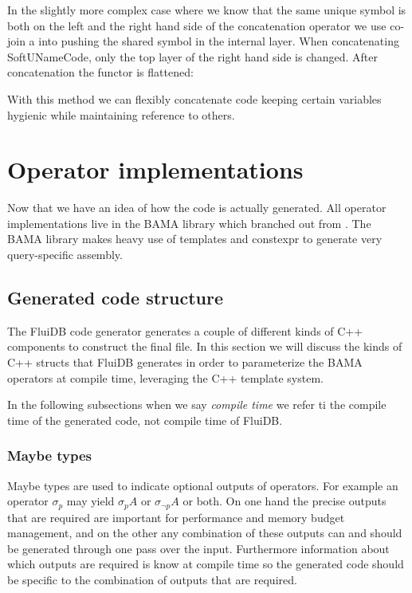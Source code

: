 In the slightly more complex case where we know that the same unique
symbol is both on the left and the right hand side of the
concatenation operator we use co-join  a into
 pushing the shared symbol in the
internal layer. When concatenating SoftUNameCode, only the top layer
of the right hand side is changed. After concatenation the functor is
flattened:

With this method we can flexibly concatenate code keeping certain
variables hygienic while maintaining reference to others.

\section{Operator implementations}

Now that we have an idea of how the code is actually generated. All
operator implementations live in the BAMA library which branched out
from \cite{krikellasGeneratingCodeHolistic2010}. The BAMA library makes
heavy use of templates and constexpr to generate very query-specific
assembly.

\subsection{Generated code structure}

The FluiDB code generator generates a couple of different kinds of C++
components to construct the final file. In this section we will
discuss the kinds of C++ structs that FluiDB generates in order to
parameterize the BAMA operators at compile time, leveraging the C++
template system.

In the following subsections when we say \emph{compile time} we refer ti
the compile time of the generated code, not compile time of FluiDB.

\subsubsection{Maybe types}

Maybe types are used to indicate optional outputs of operators. For
example an operator \(\sigma_p\) may yield \(\sigma_p A\) or
\(\sigma_{\neg p} A\) or both. On one hand the precise outputs that
are required are important for performance and memory budget
management, and on the other any combination of these outputs can and
should be generated through one pass over the input. Furthermore
information about which outputs are required is know at compile time
so the generated code should be specific to the combination of outputs
that are required.


